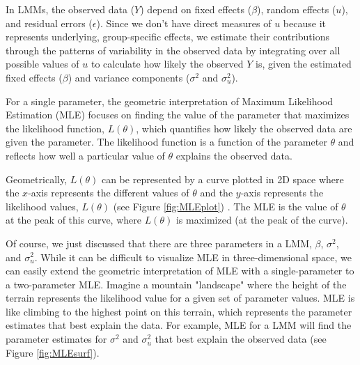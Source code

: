  In LMMs, the observed data ($Y$) depend on fixed effects ($\beta$), random effects ($u$), and residual errors ($\epsilon$). Since we don't have direct measures of $u$ because it represents underlying, group-specific effects, we estimate their contributions through the patterns of variability in the observed data by integrating over all possible values of $u$ to calculate how likely the observed $Y$ is, given the estimated fixed effects ($\beta$) and variance components ($\sigma^2$ and $\sigma_u^2$).
 
For a single parameter, the geometric interpretation of Maximum Likelihood Estimation (MLE) focuses on finding the value of the parameter that maximizes the likelihood function, $L(\theta)$, which quantifies how likely the observed data are given the parameter. The likelihood function is a function of the parameter $\theta$ and reflects how well a particular value of 
$\theta$ explains the observed data.

Geometrically, $L(\theta)$ can be represented by a curve plotted in 2D space where the $x$-axis represents the different values of $\theta$ and the $y$-axis represents the likelihood values, $L(\theta)$ (see Figure \ref{fig:MLEplot}) . The MLE is the value of $\theta$ at the peak of this curve, where $L(\theta)$ is maximized (at the peak of the curve).

Of course, we just discussed that there are three parameters in a LMM, $\beta$, $\sigma^2$, and $\sigma_u^2$.  While it can be difficult to visualize MLE in three-dimensional space, we can easily extend the geometric interpretation of MLE with a single-parameter to a two-parameter MLE. Imagine a mountain "landscape" where the height of the terrain represents the likelihood value for a given set of parameter values. MLE is like climbing to the highest point on this terrain, which represents the parameter estimates that best explain the data.  For example, MLE for a LMM will find the parameter estimates for $\sigma^2$ and $\sigma_u^2$ that best explain the observed data (see Figure \ref{fig:MLEsurf}).

